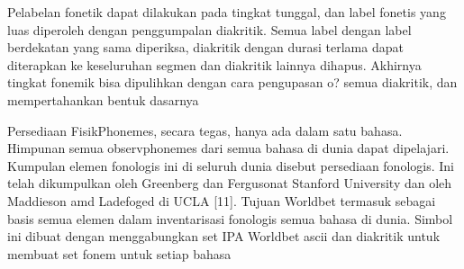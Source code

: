 Pelabelan fonetik dapat dilakukan pada tingkat tunggal, dan label fonetis yang luas diperoleh dengan penggumpalan diakritik. Semua label dengan label berdekatan yang sama diperiksa, diakritik dengan durasi terlama dapat diterapkan ke keseluruhan segmen dan diakritik lainnya dihapus. Akhirnya tingkat fonemik bisa dipulihkan dengan cara pengupasan o? semua diakritik, dan mempertahankan bentuk dasarnya

Persediaan FisikPhonemes, secara tegas, hanya ada dalam satu bahasa. Himpunan semua observphonemes dari semua bahasa di dunia dapat dipelajari. Kumpulan elemen fonologis ini di seluruh dunia disebut persediaan fonologis. Ini telah dikumpulkan oleh Greenberg dan Fergusonat Stanford University dan oleh Maddieson amd Ladefoged di UCLA [11]. Tujuan Worldbet termasuk sebagai basis semua elemen dalam inventarisasi fonologis semua bahasa di dunia. Simbol ini dibuat dengan menggabungkan set IPA Worldbet ascii dan diakritik untuk membuat set fonem untuk setiap bahasa